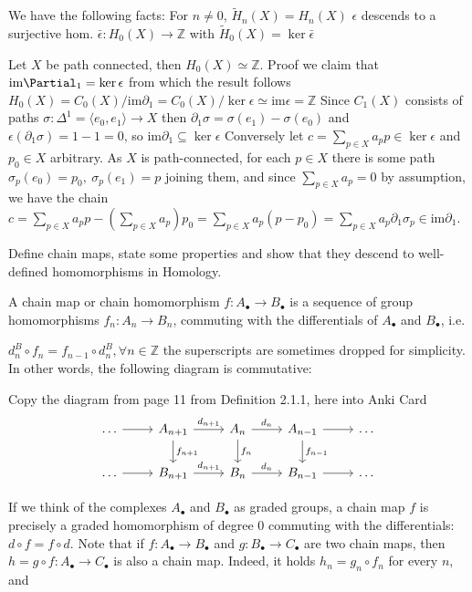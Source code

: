 We have the following facts:
For \( n \neq 0 \), \( \tilde{H}_n(X) = H_n(X) \)
\( \epsilon \) descends to a surjective hom. \( \bar{\epsilon}: H_0(X) \to \mathbb{Z} \) with \( \tilde{H}_0(X) = \ker \bar{\epsilon} \)

Let \( X \) be path connected, then  \( H_0(X) \simeq \mathbb{Z} \).
Proof we claim that \( \text{im}\Partial_1 = \ker \epsilon \) from which the result follows \( H_0(X) = C_0(X) /\text{im} \partial_1 = C_0(X) / \ker \epsilon \simeq \text{im} \epsilon = \mathbb{Z} \)
Since \( C_1(X) \) consists of paths \( \sigma : \Delta^1 = \langle e_0, e_1 \rangle \to X \) then \( \partial_1 \sigma = \sigma(e_1) - \sigma(e_0) \) and \( \epsilon(\partial_1 \sigma) = 1 - 1 = 0 \),
so \( \text{im} \partial_1 \subseteq \ker \epsilon \)
Conversely let \( c = \sum_{p \in X} a_p p \in \ker \epsilon \) and \( p_0 \in X \) arbitrary. As \( X \) is path-connected, for each \( p \in X\) there is some path \(\sigma_p(e_0) = p_0,\ \sigma_p(e_1) =p \) joining them, and since \( \sum_{p \in X} a_p = 0 \) by assumption, we have the chain
\( c = \sum_{p \in X} a_p p - (\sum_{p \in X} a_p)p_0 = \sum_{p \in X} a_p(p - p_0) = \sum_{p \in X} a_p \partial_1 \sigma_p \in \text{im} \partial_1 \).


Define chain maps, state some properties and show that they descend to well-defined homomorphisms in Homology.

A chain map or chain homomorphism \(f: A_\bullet \to B_\bullet\) is a sequence of group homomorphisms \(f_n: A_n \to B_n\), commuting with the differentials of \(A_\bullet\) and \(B_\bullet\), i.e.

\(d_{n}^B \circ f_n = f_{n-1} \circ d_{n}^B, \forall n \in \mathbb{Z}\)
the superscripts are sometimes dropped for simplicity.
In other words, the following diagram is commutative:

Copy the diagram from page 11 from Definition 2.1.1, here into Anki Card
\[\begin{tikzcd}
\dots \arrow[r] & A_{n+1} \arrow[r,"d_{n+1}"] \arrow[d,"f_{n+1}"] & A_n \arrow[r,"d_n"] \arrow[d,"f_n"] & A_{n-1} \arrow[r] \arrow[d,"f_{n-1}"] & \dots \\
\dots \arrow[r] & B_{n+1} \arrow[r,"d_{n+1}"] & B_n \arrow[r,"d_n"] & B_{n-1} \arrow[r] & \dots
\end{tikzcd}\]

If we think of the complexes \(A_\bullet\) and \(B_\bullet\) as graded groups, a chain map \(f\) is precisely a graded homomorphism of degree 0 commuting with the differentials: \(d \circ f = f \circ d\).
Note that if \(f: A_\bullet \to B_\bullet\) and \(g: B_\bullet \to C_\bullet\) are two chain maps, then \(h = g \circ f: A_\bullet \to C_\bullet\) is also a chain map. Indeed, it holds \(h_n = g_n \circ f_n\) for every \(n\), and 

